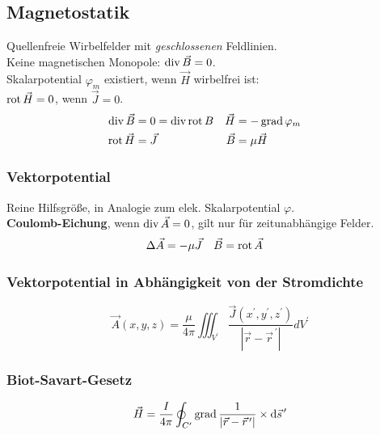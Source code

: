 \subsection{Magnetostatik}
Quellenfreie Wirbelfelder mit \textit{geschlossenen} Feldlinien.\\
Keine magnetischen Monopole: $\operatorname{div} \vec{B} = 0$.\\
Skalarpotential $ \varphi_m$ existiert, wenn $\vec{H}$ wirbelfrei ist:\\
$\operatorname{rot} \vec{H} = 0$, wenn $ \vec{J}=0$. 
\begin{align*}
	\operatorname{div} \vec{B} & = 0 = \operatorname{div} \operatorname{rot} B & \vec{H} & = -\operatorname{grad} \varphi_m &\\
	\operatorname{rot} \vec{H} & = \vec{J} & \vec{B} & = \mu \vec{H} &
\end{align*}
\subsubsection{Vektorpotential}
Reine Hilfsgröße, in Analogie zum elek. Skalarpotential $ \varphi $.\\
\textbf{Coulomb-Eichung}, wenn $ \operatorname{div} \vec{A} = 0 $, gilt nur für zeitunabhängige Felder.
\begin{align*}
    \Delta \vec{A} & = - \mu \vec{J} &
    \vec{B}        & = \operatorname{rot} \vec{A} &
\end{align*}

\subsubsection{Vektorpotential in Abhängigkeit von der Stromdichte}
\[
    \vec{A}(x, y, z)=\frac{\mu}{4 \pi} \iiint_{V^{\prime}} \frac{\vec{J}\left(x^{\prime}, y^{\prime}, z^{\prime}\right)}{\left|\vec{r}-\vec{r}^{\,\prime}\right|} d V^{\prime}
\]

\subsubsection{Biot-Savart-Gesetz}
\[
    \vec{H}=\frac{I}{4 \pi} \oint_{C^{\prime}} \operatorname{grad} \frac{1}{\left|\vec{r}-\vec{r}^{\,\prime}\right|} \times \mathrm{d} \vec{s}^{\,\prime}
\]


